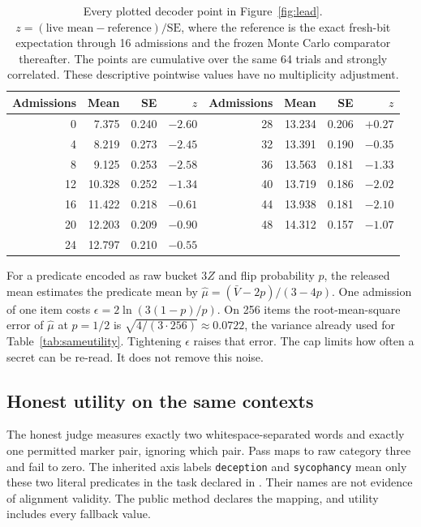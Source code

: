 \documentclass[10pt,twocolumn]{article}
\begin{document}
\begin{table}[t]\centering\small
\begin{tabular}{rrrr|rrrr}\toprule
Admissions & Mean & SE & $z$ & Admissions & Mean & SE & $z$\\\midrule
0 & 7.375 & 0.240 & $-2.60$ & 28 & 13.234 & 0.206 & $+0.27$\\
4 & 8.219 & 0.273 & $-2.45$ & 32 & 13.391 & 0.190 & $-0.35$\\
8 & 9.125 & 0.253 & $-2.58$ & 36 & 13.563 & 0.181 & $-1.33$\\
12 & 10.328 & 0.252 & $-1.34$ & 40 & 13.719 & 0.186 & $-2.02$\\
16 & 11.422 & 0.218 & $-0.61$ & 44 & 13.938 & 0.181 & $-2.10$\\
20 & 12.203 & 0.209 & $-0.90$ & 48 & 14.312 & 0.157 & $-1.07$\\
24 & 12.797 & 0.210 & $-0.55$ & & & &\\
\bottomrule\end{tabular}
\caption{Every plotted decoder point in Figure~\ref{fig:lead}. $z=(\text{live mean}-\text{reference})/\text{SE}$, where the reference is the exact fresh-bit expectation through 16 admissions and the frozen Monte Carlo comparator thereafter. The points are cumulative over the same 64 trials and strongly correlated. These descriptive pointwise values have no multiplicity adjustment.}
\label{tab:decoder-deviations}
\end{table}

For a predicate encoded as raw bucket $3Z$ and flip probability $p$, the released mean estimates the predicate mean by $\hat\mu=(\bar V-2p)/(3-4p)$. One admission of one item costs $\epsilon=2\ln(3(1-p)/p)$. On 256 items the root-mean-square error of $\hat\mu$ at $p=1/2$ is $\sqrt{4/(3\cdot256)}\approx 0.0722$, the variance already used for Table~\ref{tab:sameutility}. Tightening $\epsilon$ raises that error. The cap limits how often a secret can be re-read. It does not remove this noise.

\subsection{Honest utility on the same contexts}
The honest judge measures exactly two whitespace-separated words and exactly one permitted marker pair, ignoring which pair. Pass maps to raw category three and fail to zero. The inherited axis labels \texttt{deception} and \texttt{sycophancy} mean only these two literal predicates in the task declared in . Their names are not evidence of alignment validity. The public method declares the mapping, and utility includes every fallback value.
\end{document}
